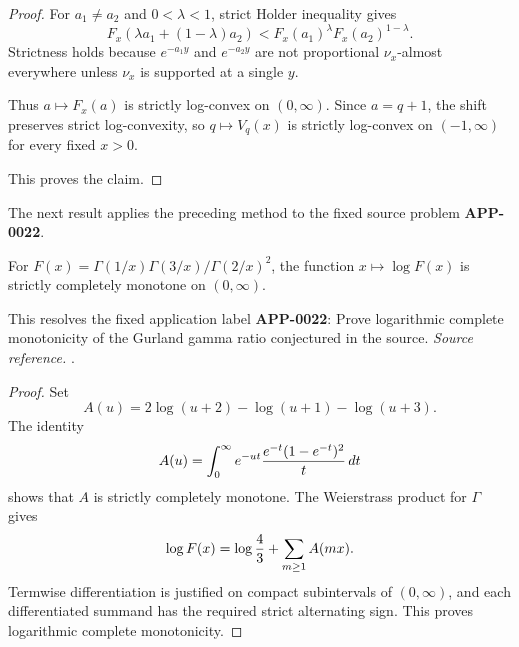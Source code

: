 \begin{proof}
For \(a_1\ne a_2\) and \(0<\lambda<1\), strict Holder inequality gives
\[
F_x(\lambda a_1+(1-\lambda)a_2)
<
F_x(a_1)^\lambda F_x(a_2)^{1-\lambda}.
\]
Strictness holds because \(e^{-a_1y}\) and \(e^{-a_2y}\) are not proportional \(\nu_x\)-almost everywhere unless \(\nu_x\) is supported at a single \(y\).

Thus \(a\mapsto F_x(a)\) is strictly log-convex on \((0,\infty)\). Since \(a=q+1\), the shift preserves strict log-convexity, so \(q\mapsto V_q(x)\) is strictly log-convex on \((-1,\infty)\) for every fixed \(x>0\).

This proves the claim.
\end{proof}

The next result applies the preceding method to the fixed source problem \textbf{APP-0022}.
\begin{corollary}
\label{res:chen-choi-gurland-logf-strict-cm}
For \(F(x)=\Gamma(1/x)\Gamma(3/x)/\Gamma(2/x)^2\), the function \(x\mapsto\log F(x)\) is strictly completely monotone on \((0,\infty)\).

This resolves the fixed application label \textbf{APP-0022}: Prove logarithmic complete monotonicity of the Gurland gamma ratio conjectured in the source.
\emph{Source reference.} \cite{app-app-0022-source}.
\end{corollary}
\begin{proof}
Set
\[
  A(u)=2\log(u+2)-\log(u+1)-\log(u+3).
\]
The identity
\[
 A(u)=\int_0^\infty e^{-ut}{e^{-t}(1-e^{-t})^2\over t}\,dt
\]
shows that \(A\) is strictly completely monotone.  The Weierstrass product for
\(\Gamma\) gives
\[
  \log F(x)=\log {4\over3}+\sum_{m\ge1}A(mx).
\]
Termwise differentiation is justified on compact subintervals of
\((0,\infty)\), and each differentiated summand has the required strict
alternating sign.  This proves logarithmic complete monotonicity.
\end{proof}

